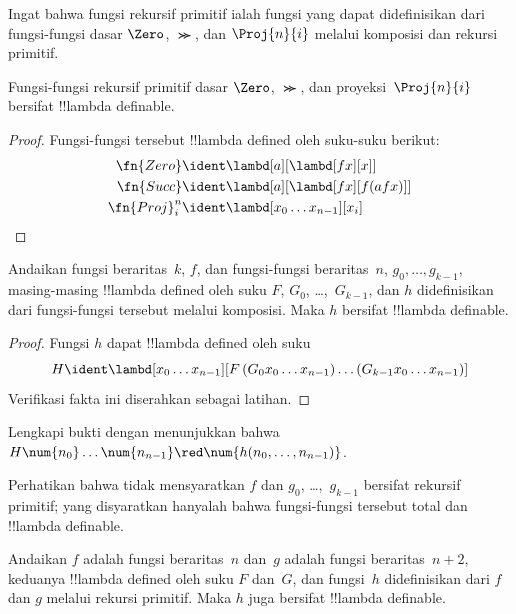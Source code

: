 \documentclass[../../../include/open-logic-section]{subfiles}
\begin{document}

Ingat bahwa fungsi rekursif primitif ialah fungsi yang dapat didefinisikan
dari fungsi-fungsi dasar $\Zero$, $\Succ$, dan $\Proj{n}{i}$ melalui
komposisi dan rekursi primitif.

\begin{lem}
  Fungsi-fungsi rekursif primitif dasar $\Zero$, $\Succ$, dan
  proyeksi~$\Proj{n}{i}$ bersifat !!{lambda definable}.
\end{lem}

\begin{proof}
Fungsi-fungsi tersebut !!{lambda defined} oleh suku-suku berikut:
\begin{align*}
  \fn{Zero} & \ident \lambd[a][\lambd[fx][x]]\\
  \fn{Succ} & \ident \lambd[a][\lambd[fx][f (a f x)]] \\
  \fn{Proj}^n_i & \ident \lambd[x_0\dots x_{n-1}][x_i]
\end{align*}
\end{proof}

\begin{lem}
   Andaikan fungsi beraritas~$k$, $f$, dan fungsi-fungsi
  beraritas~$n$, $g_0, \dots, g_{k-1}$, masing-masing
  !!{lambda defined} oleh suku $F$, $G_0$, \dots,~$G_{k-1}$, dan $h$
  didefinisikan dari fungsi-fungsi tersebut melalui komposisi. Maka $h$
  bersifat !!{lambda definable}.
\end{lem}

\begin{proof}
  Fungsi $h$ dapat !!{lambda defined} oleh suku
  \[
  H \ident \lambd[x_0 \dots x_{n-1}][F\, (G_0 x_0 \dots
    x_{n-1}) \dots (G_{k-1} x_0 \dots x_{n-1})]
  \]
  Verifikasi fakta ini diserahkan sebagai latihan.
\end{proof}

\begin{prob}
  Lengkapi bukti  dengan menunjukkan
  bahwa $H\num{n_0}\dots\num{n_{n-1}} \red \num{h(n_0, \dots,
    n_{n-1})}$.
\end{prob}

Perhatikan bahwa  tidak mensyaratkan $f$ dan $g_0$,
\dots,~$g_{k-1}$ bersifat rekursif primitif; yang disyaratkan hanyalah bahwa
fungsi-fungsi tersebut total dan !!{lambda definable}.

\begin{lem}
  Andaikan $f$ adalah fungsi beraritas~$n$ dan~$g$ adalah fungsi
  beraritas~$n+2$, keduanya !!{lambda defined} oleh suku $F$ dan~$G$, dan
  fungsi~$h$ didefinisikan dari $f$ dan $g$ melalui rekursi primitif.
  Maka $h$ juga bersifat !!{lambda definable}.
\end{lem}
\end{document}
